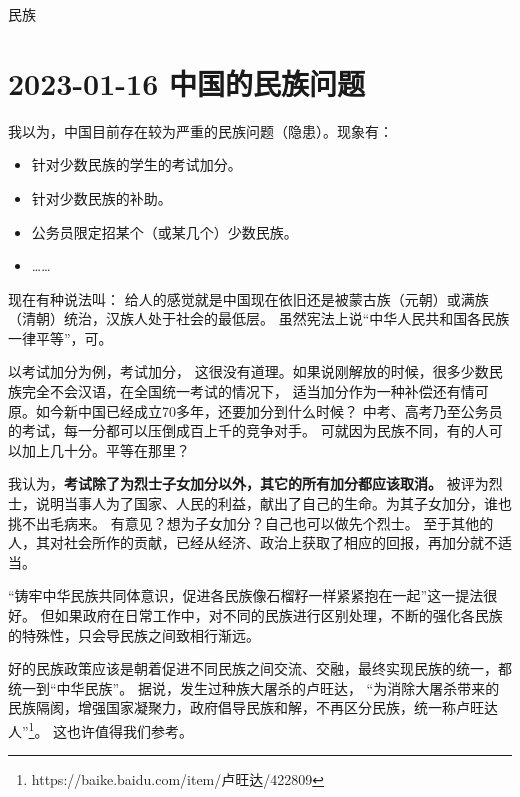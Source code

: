\begin{taged}{民族}
\section{2023-01-16 中国的民族问题}
\end{taged}

我以为，中国目前存在较为严重的民族问题（隐患）。现象有：

\begin{itemize}[nosep, left=\parindent]
    \item 针对少数民族的学生的考试加分。
    \item 针对少数民族的补助。
    \item 公务员限定招某个（或某几个）少数民族。
    \item ……
\end{itemize}

现在有种说法叫：
给人的感觉就是中国现在依旧还是被蒙古族（元朝）或满族（清朝）统治，汉族人处于社会的最低层。
虽然宪法上说“中华人民共和国各民族一律平等”，可。

以考试加分为例，考试加分，
这很没有道理。如果说刚解放的时候，很多少数民族完全不会汉语，在全国统一考试的情况下，
适当加分作为一种补偿还有情可原。如今新中国已经成立70多年，还要加分到什么时候？
中考、高考乃至公务员的考试，每一分都可以压倒成百上千的竞争对手。
可就因为民族不同，有的人可以加上几十分。平等在那里？

我认为，\textbf{考试除了为烈士子女加分以外，其它的所有加分都应该取消。}
被评为烈士，说明当事人为了国家、人民的利益，献出了自己的生命。为其子女加分，谁也挑不出毛病来。
有意见？想为子女加分？自己也可以做先个烈士。
至于其他的人，其对社会所作的贡献，已经从经济、政治上获取了相应的回报，再加分就不适当。

“铸牢中华民族共同体意识，促进各民族像石榴籽一样紧紧抱在一起”这一提法很好。
但如果政府在日常工作中，对不同的民族进行区别处理，不断的强化各民族的特殊性，只会导民族之间致相行渐远。

好的民族政策应该是朝着促进不同民族之间交流、交融，最终实现民族的统一，都统一到“中华民族”。
据说，发生过种族大屠杀的卢旺达，
“为消除大屠杀带来的民族隔阂，增强国家凝聚力，政府倡导民族和解，不再区分民族，统一称卢旺达人”\footnote{https://baike.baidu.com/item/卢旺达/422809}。
这也许值得我们参考。


